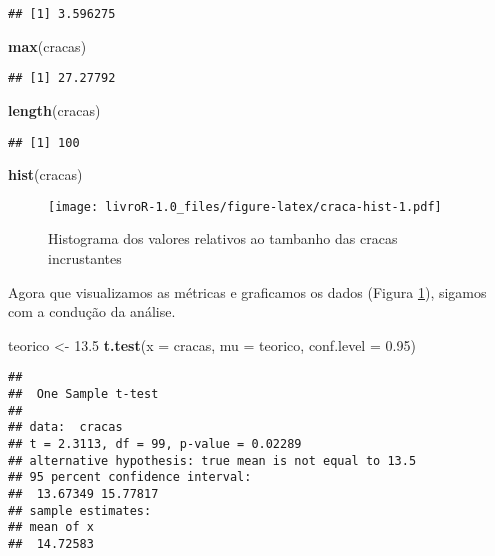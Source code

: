 \documentclass[]{book}
\newenvironment{Shaded}{\begin{snugshade}}{\end{snugshade}}
\newcommand{\DataTypeTok}[1]{\textcolor[rgb]{0.13,0.29,0.53}{#1}}
\newcommand{\FloatTok}[1]{\textcolor[rgb]{0.00,0.00,0.81}{#1}}
\newcommand{\KeywordTok}[1]{\textcolor[rgb]{0.13,0.29,0.53}{\textbf{#1}}}
\newcommand{\NormalTok}[1]{#1}
\newcommand{\StringTok}[1]{\textcolor[rgb]{0.31,0.60,0.02}{#1}}
\begin{document}
\begin{verbatim}
## [1] 3.596275
\end{verbatim}

\begin{Shaded}
\begin{Highlighting}[]
\KeywordTok{max}\NormalTok{(cracas)}
\end{Highlighting}
\end{Shaded}

\begin{verbatim}
## [1] 27.27792
\end{verbatim}

\begin{Shaded}
\begin{Highlighting}[]
\KeywordTok{length}\NormalTok{(cracas)}
\end{Highlighting}
\end{Shaded}

\begin{verbatim}
## [1] 100
\end{verbatim}

\begin{Shaded}
\begin{Highlighting}[]
\KeywordTok{hist}\NormalTok{(cracas)}
\end{Highlighting}
\end{Shaded}

\begin{figure}
\centering
\texttt{[image: livroR-1.0\_files/figure-latex/craca-hist-1.pdf]}
\caption{\label{fig:craca-hist}Histograma dos valores relativos ao tambanho das cracas incrustantes}
\end{figure}

Agora que visualizamos as métricas e graficamos os dados (Figura \ref{fig:craca-hist}), sigamos com a condução da análise.

\begin{Shaded}
\begin{Highlighting}[]
\NormalTok{teorico <-}\StringTok{ }\FloatTok{13.5}
\KeywordTok{t.test}\NormalTok{(}\DataTypeTok{x =}\NormalTok{ cracas, }\DataTypeTok{mu =}\NormalTok{ teorico, }\DataTypeTok{conf.level =} \FloatTok{0.95}\NormalTok{)}
\end{Highlighting}
\end{Shaded}

\begin{verbatim}
## 
##  One Sample t-test
## 
## data:  cracas
## t = 2.3113, df = 99, p-value = 0.02289
## alternative hypothesis: true mean is not equal to 13.5
## 95 percent confidence interval:
##  13.67349 15.77817
## sample estimates:
## mean of x 
##  14.72583
\end{verbatim}
\end{document}
